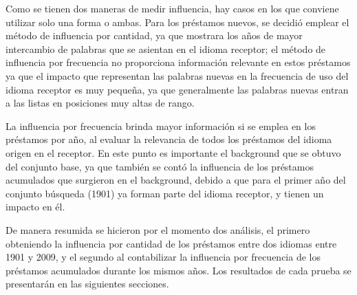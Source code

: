Como se tienen dos maneras de medir influencia,  hay casos en los que conviene utilizar solo una forma o ambas.  Para los préstamos nuevos, se decidió emplear el método de influencia por cantidad, ya que mostrara los años de mayor intercambio de palabras que se asientan en el idioma receptor; el método de influencia por frecuencia no proporciona información relevante en estos préstamos ya que el impacto que representan las palabras nuevas en la frecuencia de uso del idioma receptor es muy pequeña, ya que generalmente las palabras nuevas entran a las listas en posiciones muy altas de rango.  

La influencia por frecuencia brinda mayor información si se emplea en los préstamos por año, al evaluar la relevancia de todos los préstamos del idioma origen en el receptor. En este punto es importante el background que se obtuvo del conjunto base, ya que también se contó la influencia de los préstamos acumulados que surgieron en el background, debido a que para el primer año del conjunto búsqueda (1901) ya forman parte del idioma receptor, y tienen un impacto en él. 

De manera resumida se hicieron por el momento dos análisis, el primero obteniendo la influencia por cantidad de los préstamos entre dos idiomas entre 1901 y 2009, y el segundo al contabilizar la influencia por frecuencia de los préstamos acumulados durante los mismos años.  Los resultados de cada prueba se presentarán en las siguientes secciones. 


